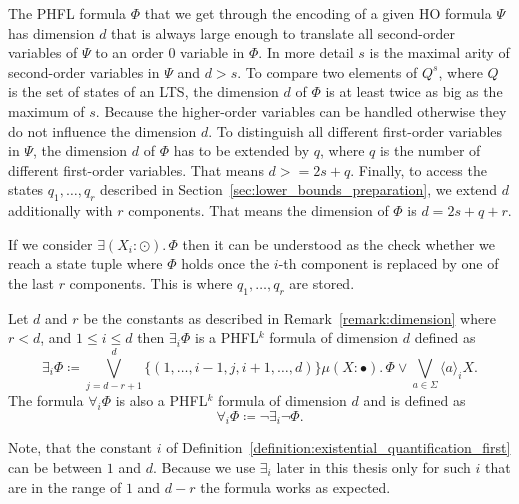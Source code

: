 \begin{remark}
\label{remark:dimension}
    The PHFL formula $\Phi$ that we get through the encoding of a given HO formula $\Psi$ has dimension
    $d$ that is always large enough to translate all second-order variables of $\Psi$ to an order $0$ variable in
    $\Phi$. In more detail $s$ is the maximal arity of second-order variables in $\Psi$ and $d > s$. To compare
    two  elements of $Q^{s}$, where $Q$ is the set of states of an LTS, the dimension $d$ of 
    $\Phi$ is at least twice as big as the maximum of $s$. Because the higher-order variables can be handled otherwise they do not influence the dimension $d$. To distinguish all
    different first-order variables in $\Psi$, the dimension $d$ of $\Phi$ has to be extended by $q$, where $q$ is the number of different first-order variables. That means $d >= 2s + q$. Finally, to access the 
    states $q_1, \dots, q_r$ described in Section~\ref{sec:lower_bounds_preparation}, 
    we extend $d$ additionally with $r$ components. That means the dimension of $\Phi$ is $d = 2s + q + r$.
\end{remark}

If we consider $\exists (X_i \colon \odot).\,\Phi$ then it can be understood as the check whether we reach a state tuple where $
\Phi$ holds once the $i$-th component is replaced by one of the last $r$ components. This is where $q_1, \dots, q_r$ are stored.

\begin{definition}
\label{definition:existential_quantification_first}
    Let $d$ and $r$ be the constants as described in Remark~\ref{remark:dimension} where $r < d$, and $1 \leq i \leq d$ then $\exists_i \Phi$ is a PHFL$^k$ formula of dimension $d$ defined as
    \[\exists_i \Phi \coloneqq \bigvee^{d}_{j=d-r+1} \{(1, \dots, i-1, j, i + 1, \dots, d)\} \mu (X
    \colon \bullet).\,\Phi \vee \bigvee_{a \in \Sigma} \langle a \rangle_{i} X.\]
    The formula $\forall_i \Phi$ is also a PHFL$^k$ formula of dimension $d$ and is defined as
    \[\forall_i \Phi \coloneqq \neg \exists_i \neg \Phi.\]
\end{definition}

Note, that the constant $i$ of Definition~\ref{definition:existential_quantification_first} can be between $1$ and $d$. Because we use $\exists_i$ later in this thesis only for such $i$ that are in the range of $1$ and $d - r$ the formula works as expected.

